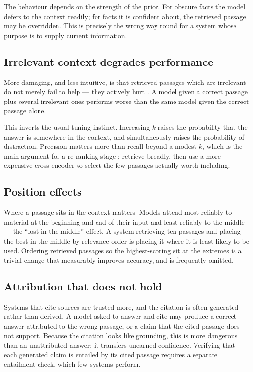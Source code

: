 \documentclass[11pt,a4paper]{article}
\begin{document}
The behaviour depends on the strength of the prior. For obscure facts the
model defers to the context readily; for facts it is confident about, the
retrieved passage may be overridden. This is precisely the wrong way round for
a system whose purpose is to supply current information.

\subsection{Irrelevant context degrades performance}

More damaging, and less intuitive, is that retrieved passages which are
irrelevant do not merely fail to help --- they actively hurt
\cite{shi2023}. A model given a correct passage plus several irrelevant ones
performs worse than the same model given the correct passage alone.

This inverts the usual tuning instinct. Increasing $k$ raises the probability
that the answer is somewhere in the context, and simultaneously raises the
probability of distraction. Precision matters more than recall beyond a
modest $k$, which is the main argument for a re-ranking stage
\cite{nogueira2019}: retrieve broadly, then use a more expensive
cross-encoder to select the few passages actually worth including.

\subsection{Position effects}

Where a passage sits in the context matters. Models attend most reliably to
material at the beginning and end of their input and least reliably to the
middle \cite{liu2024} --- the ``lost in the middle'' effect. A system
retrieving ten passages and placing the best in the middle by relevance order
is placing it where it is least likely to be used. Ordering retrieved passages
so the highest-scoring sit at the extremes is a trivial change that measurably
improves accuracy, and is frequently omitted.

\subsection{Attribution that does not hold}

Systems that cite sources are trusted more, and the citation is often
generated rather than derived. A model asked to answer and cite may produce a
correct answer attributed to the wrong passage, or a claim that the cited
passage does not support. Because the citation looks like grounding, this is
more dangerous than an unattributed answer: it transfers unearned confidence.
Verifying that each generated claim is entailed by its cited passage requires a
separate entailment check, which few systems perform.
\end{document}
